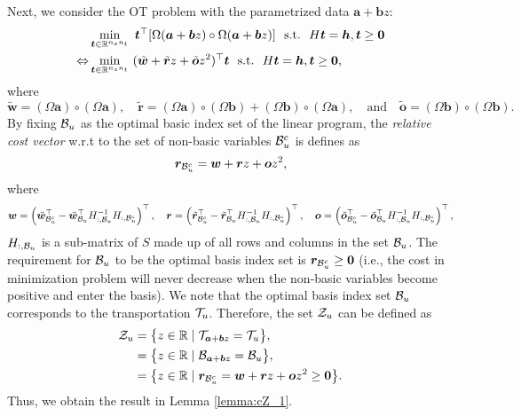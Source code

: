 Next, we consider the OT problem with the parametrized data $\bm a + \bm b z$:
%
\begin{align*} 
	& \min \limits_{\bm t \in \mathbb{R}^{n_s n_t}} ~  
	\bm t^\top 
	[ \Omega (\bm a + \bm b z) 
	\circ
	\Omega (\bm a + \bm b z)]
	~ ~
	\text{s.t.}
	~ ~
	 H \bm t = \bm h, \bm t \geq \bm 0 \\ 
	 \Leftrightarrow
	 & \min \limits_{\bm t \in \mathbb{R}^{n_s n_t}} ~  
	(\tilde{\bm w} + \tilde{\bm r} z + \tilde{\bm o} z^2)^\top \bm t
	~ ~
	\text{s.t.}
	~ ~
	 H \bm t = \bm h, \bm t \geq \bm 0,
\end{align*}
%
where 
\[ \tilde{\bm w} = (\Omega \bm a) \circ (\Omega \bm a), 
\quad \tilde{\bm r} = (\Omega \bm a) \circ (\Omega \bm b) + (\Omega \bm b) \circ (\Omega \bm a), 
\quad \text{and} \quad  \tilde{\bm o} = (\Omega \bm b) \circ (\Omega \bm b).\]
%
By fixing ${\mathcal B}_u$ as the optimal basic index set of the linear program, the \emph{relative cost vector} w.r.t to the set of non-basic variables ${\mathcal B}^c_u$ is defines as 
%
\begin{align*}
	\bm r_{{\mathcal B}^c_u} = \bm w + \bm r z + \bm o z^2,
\end{align*}
%
where 
\begin{align} \label{eq:w_r_o}
\bm w = 
\left(
	\tilde{\bm w}_{{\mathcal B}^c_u}^\top - \tilde{\bm w}_{{\mathcal B}_u}^\top H_{:, {\mathcal B}_u}^{-1} H_{:, {\mathcal B}^c_u}
\right)^\top,
\quad
\bm r = 
\left(
	\tilde{\bm r}_{{\mathcal B}^c_u}^\top - \tilde{\bm r}_{{\mathcal B}_u}^\top H_{:, {\mathcal B}_u}^{-1} H_{:, {\mathcal B}^c_u}
\right)^\top,
\quad
\bm o = 
\left(
	\tilde{\bm o}_{{\mathcal B}^c_u}^\top - \tilde{\bm o}_{{\mathcal B}_u}^\top H_{:, {\mathcal B}_u}^{-1} H_{:, {\mathcal B}^c_u}
\right)^\top,
\end{align}
%
$H_{:, {\mathcal B}_u}$ is a sub-matrix of $S$ made up of all rows and columns in the set ${\mathcal B}_u$.
%
The requirement for ${\mathcal B}_u$ to be the optimal basis index set is $\bm r_{{\mathcal B}^c_u} \geq \bm 0$ (i.e., the cost in minimization problem will never decrease when the non-basic variables become positive and enter the basis).
%
We note that the optimal basis index set ${\mathcal B}_u$ corresponds to the transportation ${\mathcal T}_u$.
%
Therefore, the set ${\mathcal Z}_u$ can be defined as 
%
\begin{align*}
	{\mathcal Z}_u &= \big \{ z \in \mathbb{R} \mid  {\mathcal T}_{\bm a + \bm b z} = {\mathcal T}_u \big\}, \\ 
	&= \big \{ z \in \mathbb{R} \mid  {\mathcal B}_{\bm a + \bm b z} = {\mathcal B}_u \big\}, \\ 
	& = \big \{ z \in \mathbb{R} \mid  \bm r_{{\mathcal B}^c_u} = \bm w + \bm r z + \bm o z^2 \geq \bm 0 \big\}.
\end{align*}
%
Thus, we obtain the result in Lemma \ref{lemma:cZ_1}.

